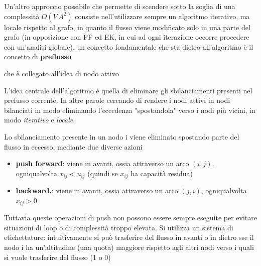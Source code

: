 Un'altro approccio possibile che permette di scendere sotto la soglia di una complessità $O(V\,A^2)$ consiste nell'utilizzare sempre un algoritmo iterativo, ma locale rispetto al grafo, in quanto il flusso viene modificato solo in una parte del grafo (in opposizione con FF ed EK, in cui ad ogni iterazione occorre procedere con un’analisi globale), un concetto fondamentale che sta dietro all'algoritmo è il concetto di \textbf{preflusso}


che è collegato all'idea di nodo attivo

L'idea centrale dell'algoritmo è quella di eliminare gli sbilanciamenti presenti nel prefusso corrente. In altre parole cercando di rendere i nodi attivi in nodi bilanciati in modo eliminando l'eccedenza "spostandola" verso i nodi più vicini, in modo \textit{iterativo} e \textit{locale}.

Lo sbilanciamento presente in un nodo i viene eliminato spostando parte del flusso in eccesso, mediante due diverse azioni
\begin{itemize}
  \item \textbf{push forward}: viene in avanti, ossia attraverso un arco $(i, j)$, ogniqualvolta $x_{ij} < u_{ij}$ (quindi se $x_{ij}$ ha capacità residua)
  \item \textbf{backward.}: viene in avanti, ossia attraverso un arco $(j, i)$, ogniqualvolta $x_{ij} > 0$
\end{itemize}

Tuttavia queste operazioni di push non possono essere sempre eseguite per evitare situazioni di loop o di complessità troppo elevata. Si utilizza un sistema di etichettature: intuitivamente si può trasferire del flusso in avanti o in dietro sse il nodo i ha un'altitudine (una quota) maggiore rispetto agli altri nodi verso i quali si vuole trasferire del flusso (1 o 0)

